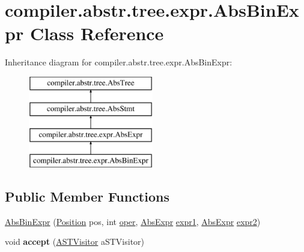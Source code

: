 \hypertarget{classcompiler_1_1abstr_1_1tree_1_1expr_1_1_abs_bin_expr}{}\section{compiler.\+abstr.\+tree.\+expr.\+Abs\+Bin\+Expr Class Reference}
\label{classcompiler_1_1abstr_1_1tree_1_1expr_1_1_abs_bin_expr}
Inheritance diagram for compiler.\+abstr.\+tree.\+expr.\+Abs\+Bin\+Expr\+:\begin{figure}[H]
\begin{center}
\leavevmode
\includegraphics[height=4.000000cm]{classcompiler_1_1abstr_1_1tree_1_1expr_1_1_abs_bin_expr}
\end{center}
\end{figure}
\subsection*{Public Member Functions}
\begin{DoxyCompactItemize}
\item 
\hyperlink{classcompiler_1_1abstr_1_1tree_1_1expr_1_1_abs_bin_expr_a839103aeb8272387504a9984ca4ee4f6}{Abs\+Bin\+Expr} (\hyperlink{classcompiler_1_1_position}{Position} pos, int \hyperlink{classcompiler_1_1abstr_1_1tree_1_1expr_1_1_abs_bin_expr_ab555bbd61a58b1bbe86fec80c1bf137f}{oper}, \hyperlink{classcompiler_1_1abstr_1_1tree_1_1expr_1_1_abs_expr}{Abs\+Expr} \hyperlink{classcompiler_1_1abstr_1_1tree_1_1expr_1_1_abs_bin_expr_a90e9b5a2604ab33a2960cc35720ca57e}{expr1}, \hyperlink{classcompiler_1_1abstr_1_1tree_1_1expr_1_1_abs_expr}{Abs\+Expr} \hyperlink{classcompiler_1_1abstr_1_1tree_1_1expr_1_1_abs_bin_expr_afd0f06a304d0de88acde89b2f832171c}{expr2})
\item 
\mbox{\label{classcompiler_1_1abstr_1_1tree_1_1expr_1_1_abs_bin_expr_a3afa74a1c1b301310eaf496bcbf48bea}} 
void {\bfseries accept} (\hyperlink{interfacecompiler_1_1abstr_1_1_a_s_t_visitor}{A\+S\+T\+Visitor} a\+S\+T\+Visitor)
\end{DoxyCompactItemize}

